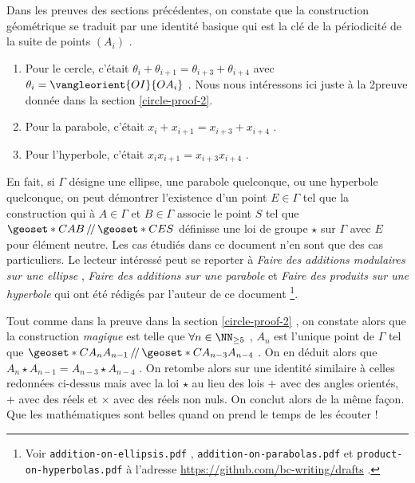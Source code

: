 Dans les preuves des sections précédentes, on constate que la construction géométrique se traduit par une identité basique qui est la clé de la périodicité de la suite de points $\left( A_i \right)$ . 
\begin{enumerate}
	\item Pour le cercle, c'était $\theta_i + \theta_{i+1} = \theta_{i+3} + \theta_{i+4}$ avec $\theta_i = \vangleorient{OI}{OA_i}$ . Nous nous intéressons ici juste à la 2\ieme preuve donnée dans la section \ref{circle-proof-2}. 

	\item Pour la parabole, c'était $x_i + x_{i+1} = x_{i+3} + x_{i+4}$ . 

	\item Pour l'hyperbole, c'était  $x_i x_{i+1} = x_{i+3} x_{i+4}$ . 
\end{enumerate}


\medskip


En fait, si $\Gamma$ désigne une ellipse, une parabole quelconque, ou une hyperbole quelconque, on peut démontrer l'existence d'un point $E \in \Gamma$ tel que la construction qui à $A \in \Gamma$ et $B \in \Gamma$ associe le point $S$ tel que $\geoset*{C}{AB} \,/\!/\, \geoset*{C}{ES}$ définisse une loi de groupe $\star$ sur $\Gamma$ avec $E$ pour élément neutre. 
Les cas étudiés dans ce document n'en sont que des cas particuliers. 
Le lecteur intéressé peut se reporter à  
\emph{\og Faire des additions modulaires sur une ellipse \fg} ,
\emph{\og Faire des additions sur une parabole \fg} 
et
\emph{\og Faire des produits sur une hyperbole \fg}
qui ont été rédigés par l'auteur de ce document
\footnote{
	Voir \texttt{addition-on-ellipsis.pdf} , \texttt{addition-on-parabolas.pdf}  et \texttt{product-on-hyperbolas.pdf}  à l'adresse \url{https://github.com/bc-writing/drafts} .
}.


\medskip


Tout comme dans la preuve dans la section \ref{circle-proof-2} , on constate alors que la construction \emph{\og magique \fg} est telle que $\forall n \in \NN_{\geq 5}$ , $A_{n}$ est l'unique point de $\Gamma$ tel que $\geoset*{C}{A_{n} A_{n-1}} \,/\!/\, \geoset*{C}{A_{n-3} A_{n-4}}$ . On en déduit alors que $A_{n} \star A_{n-1} = A_{n-3} \star A_{n-4}$ . On retombe alors sur une identité similaire à celles redonnées ci-dessus mais avec la loi $\star$ au lieu des lois $+$ avec des angles orientés, $+$ avec des réels et $\times$ avec des réels non nuls. On conclut alors de la même façon. Que les mathématiques sont belles quand on prend le temps de les écouter !
